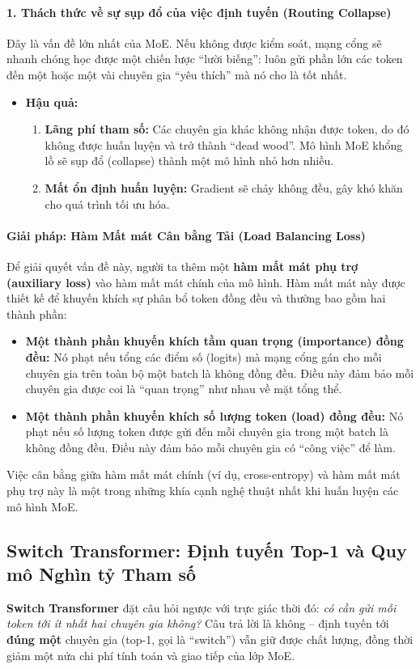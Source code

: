 \paragraph{1. Thách thức về sự sụp đổ của việc định tuyến (Routing Collapse)}
Đây là vấn đề lớn nhất của MoE. Nếu không được kiểm soát, mạng cổng sẽ nhanh chóng học được một chiến lược “lười biếng”: luôn gửi phần lớn các token đến một hoặc một vài chuyên gia “yêu thích” mà nó cho là tốt nhất.
\begin{itemize}
    \item \textbf{Hậu quả:}
        \begin{enumerate}
            \item \textbf{Lãng phí tham số:} Các chuyên gia khác không nhận được token, do đó không được huấn luyện và trở thành “dead wood”. Mô hình MoE khổng lồ sẽ sụp đổ (collapse) thành một mô hình nhỏ hơn nhiều.
            \item \textbf{Mất ổn định huấn luyện:} Gradient sẽ chảy không đều, gây khó khăn cho quá trình tối ưu hóa.
        \end{enumerate}
\end{itemize}

\paragraph{Giải pháp: Hàm Mất mát Cân bằng Tải (Load Balancing Loss)}
Để giải quyết vấn đề này, người ta thêm một \textbf{hàm mất mát phụ trợ (auxiliary loss)} vào hàm mất mát chính của mô hình. Hàm mất mát này được thiết kế để khuyến khích sự phân bổ token đồng đều và thường bao gồm hai thành phần:
\begin{itemize}
    \item \textbf{Một thành phần khuyến khích tầm quan trọng (importance) đồng đều:} Nó phạt nếu tổng các điểm số (logits) mà mạng cổng gán cho mỗi chuyên gia trên toàn bộ một batch là không đồng đều. Điều này đảm bảo mỗi chuyên gia được coi là “quan trọng” như nhau về mặt tổng thể.
    \item \textbf{Một thành phần khuyến khích số lượng token (load) đồng đều:} Nó phạt nếu số lượng token được gửi đến mỗi chuyên gia trong một batch là không đồng đều. Điều này đảm bảo mỗi chuyên gia có “công việc” để làm.
\end{itemize}
Việc cân bằng giữa hàm mất mát chính (ví dụ, cross-entropy) và hàm mất mát phụ trợ này là một trong những khía cạnh nghệ thuật nhất khi huấn luyện các mô hình MoE.

\subsection{Switch Transformer: Định tuyến Top-1 và Quy mô Nghìn tỷ Tham số \newtag}
\label{ssec:switch_transformer}
\textbf{Switch Transformer} \cite{fedus2022switch} đặt câu hỏi ngược với trực giác thời đó: \emph{có cần gửi mỗi token tới ít nhất hai chuyên gia không?} Câu trả lời là không -- định tuyến tới \textbf{đúng một} chuyên gia (top-1, gọi là “switch”) vẫn giữ được chất lượng, đồng thời giảm một nửa chi phí tính toán và giao tiếp của lớp MoE.

